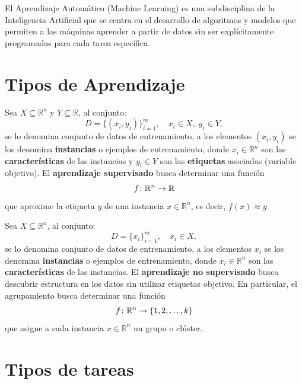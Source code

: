 \documentclass[a4,11pt]{aleph-notas}
\begin{document}
\encabezado


\begin{defi}
    El Aprendizaje Automático (Machine Learning) es una subdisciplina de la Inteligencia Artificial que se centra en el desarrollo de algoritmos y modelos que permiten a las máquinas aprender a partir de datos sin ser explícitamente programadas para cada tarea específica.
\end{defi}

\section{Tipos de Aprendizaje}

\begin{defi}
    Sea $X \subseteq \mathbb{R}^n$ y $Y\subseteq \mathbb{R}$, al conjunto:
    \[
        D=\{(x_i,y_i)\}_{i=1}^{m},\quad x_i\in X,\;y_i\in Y,
    \]
    se lo denomina conjunto de datos de entrenamiento, a los elementos $(x_i, y_i)$ se los denomina \textbf{instancias} o ejemplos de entrenamiento, donde $x_i \in \mathbb{R}^n$ son las \textbf{características} de las instancias y $y_i \in Y$ son las \textbf{etiquetas} asociadas (variable objetivo). El \textbf{aprendizaje supervisado} busca determinar una función 
    \[
        f\colon \mathbb{R}^n \rightarrow \mathbb{R}
    \]
    que aproxime la etiqueta $y$ de una instancia $x \in \mathbb{R}^n$, es decir, $f(x) \approx y$.
\end{defi}

\begin{defi}
    Sea $X \subseteq \mathbb{R}^n$, al conjunto:
    \[
        D=\{x_i\}_{i=1}^{m},\quad x_i\in X,
    \]
    se lo denomina conjunto de datos de entrenamiento, a los elementos $x_i$ se los denomina \textbf{instancias} o ejemplos de entrenamiento, donde $x_i \in \mathbb{R}^n$ son las \textbf{características} de las instancias. El \textbf{aprendizaje no supervisado} busca descubrir estructura en los datos sin utilizar etiquetas objetivo. En particular, el agrupamiento busca determinar una función
    \[
        f\colon \mathbb{R}^n \rightarrow \{1, 2, \dots, k\}
    \]
    que asigne a cada instancia $x \in \mathbb{R}^n$ un grupo o clúster.
\end{defi}

\pagebreak
\section{Tipos de tareas}
\end{document}
